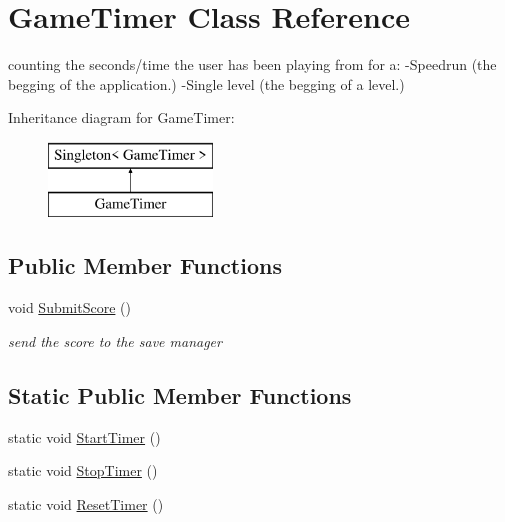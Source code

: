\hypertarget{class_game_timer}{}\section{Game\+Timer Class Reference}
\label{class_game_timer}


counting the seconds/time the user has been playing from for a\+: -\/\+Speedrun (the begging of the application.) -\/\+Single level (the begging of a level.)  


Inheritance diagram for Game\+Timer\+:\begin{figure}[H]
\begin{center}
\leavevmode
\includegraphics[height=2.000000cm]{class_game_timer}
\end{center}
\end{figure}
\subsection*{Public Member Functions}
\begin{DoxyCompactItemize}
\item 
void \mbox{\hyperlink{class_game_timer_a46d9f3e6d1b6686e3b815d8aa9a51fef}{Submit\+Score}} ()
\begin{DoxyCompactList}\small\item\em send the score to the save manager \end{DoxyCompactList}\end{DoxyCompactItemize}
\subsection*{Static Public Member Functions}
\begin{DoxyCompactItemize}
\item 
static void \mbox{\hyperlink{class_game_timer_a9080e5f61142bb77abf558f025f03e77}{Start\+Timer}} ()
\item 
static void \mbox{\hyperlink{class_game_timer_a34ab1c3bf4fb8cced4111bf098c2dd63}{Stop\+Timer}} ()
\item 
static void \mbox{\hyperlink{class_game_timer_aaf5a277562bd3b15d7db641f14421329}{Reset\+Timer}} ()
\end{DoxyCompactItemize}

